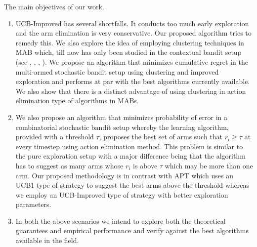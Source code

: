 The main objectives of our work.
\begin{enumerate}
\item UCB-Improved has several shortfalls. It conducts too much early exploration and the arm elimination is very conservative. Our proposed algorithm tries to remedy this. We also explore the idea of employing clustering techniques in MAB which, till now has only been studied in the contextual bandit setup (see \cite{li2010contextual}, \cite{bui2012clustered}, \cite{gentile2014online}, \cite{nguyen2014dynamic}). We propose an algorithm that minimizes cumulative regret in the multi-armed stochastic bandit setup using clustering and improved exploration and performs at par with the best algorithms currently available. We also show that there is a distinct advantage of using clustering in action elimination type of algorithms in MABs.
\item We also propose an algorithm that minimizes probability of error in a combinatorial stochastic bandit setup whereby the learning algorithm, provided with a threshold $\tau$, proposes the best set of arms such that $r_{i}\geq \tau$ at every timestep using action elimination method. This problem is similar to the pure exploration setup with a major difference being that the algorithm has to suggest as many arms whose $r_{i}$ is above $\tau$ which may be more than one arm. Our proposed methodology is in contrast with APT which uses an UCB1 type of strategy to suggest the best arms above the threshold whereas we employ an UCB-Improved type of strategy with better exploration parameters.
\item In both the above scenarios we intend to explore both the theoretical guarantees and empirical performance and verify against the best algorithms available in the field.     
\end{enumerate}